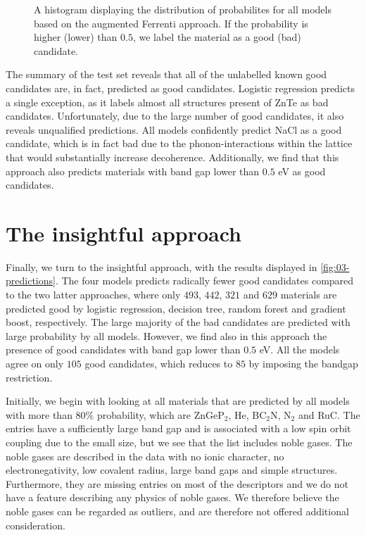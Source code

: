 \begin{figure}[ht!]
    \centering
    
    \vspace*{-130mm}
    \caption{A histogram displaying the distribution of probabilites for all models based on the augmented Ferrenti approach. If the probability is higher (lower) than $0.5$, we label the material as a good (bad) candidate.}
    \label{fig:histogram-augmented-ferrenti}
\end{figure}

The summary of the test set reveals that all of the unlabelled known good candidates are, in fact, predicted as good candidates. Logistic regression predicts a single exception, as it labels almost all structures present of ZnTe as bad candidates. Unfortunately, due to the large number of good candidates, it also reveals unqualified predictions. All models confidently predict NaCl as a good candidate, which is in fact bad due to the phonon-interactions within the lattice that would substantially increase decoherence. Additionally, we find that this approach also predicts materials with band gap lower than $0.5$ eV as good candidates.


\section{The insightful approach}

Finally, we turn to the insightful approach, with the results displayed in \autoref{fig:03-predictions}. The four models predicts radically fewer good candidates compared to the two latter approaches, where only $493$, $442$, $321$ and $629$ materials are predicted good by logistic regression, decision tree, random forest and gradient boost, respectively. The large majority of the bad candidates are predicted with large probability by all models. However, we find also in this approach the presence of good candidates with band gap lower than $0.5$ eV. All the models agree on only $105$ good candidates, which reduces to $85$ by imposing the bandgap restriction.



\noindent Initially, we begin with looking at all materials that are predicted by all models with more than $80\%$ probability, which are ZnGeP$_2$, He, BC$_2$N, N$_2$ and RuC. The entries have a sufficiently large band gap and is associated with a low spin orbit coupling due to the small size, but we see that the list includes noble gases. The noble gases are described in the data with no ionic character, no electronegativity, low covalent radius, large band gaps and simple structures. Furthermore, they are missing entries on most of the descriptors and we do not have a feature describing any physics of noble gases. We therefore believe the noble gases can be regarded as outliers, and are therefore not offered additional consideration.

